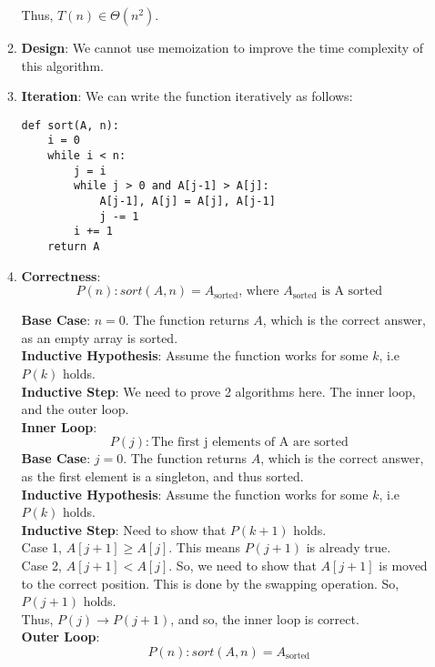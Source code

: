 \documentclass[a4paper]{article}
\begin{document}
\begin{enumerate}
\begin{enumerate}[label=\roman*]
Thus, $T(n) \in \Theta(n^2)$.\\

\item \textbf{Design}: We cannot use memoization to improve the time complexity of this algorithm.

\item \textbf{Iteration}: We can write the function iteratively as follows:

\begin{verbatim}
def sort(A, n):
    i = 0
    while i < n:
        j = i
        while j > 0 and A[j-1] > A[j]:
            A[j-1], A[j] = A[j], A[j-1]
            j -= 1
        i += 1
    return A
\end{verbatim}

\item \textbf{Correctness}:
$$P(n): sort(A, n) = A_{\text{sorted}} \text{, where } A_{\text{sorted}} \text{ is A sorted}$$

\textbf{Base Case}: $n = 0$. The function returns $A$, which is the correct answer, as an empty array is sorted. \\
\textbf{Inductive Hypothesis}: Assume the function works for some $k$, i.e $P(k)$ holds.\\
\textbf{Inductive Step}: We need to prove 2 algorithms here. The inner loop, and the outer loop.\\

\textbf{Inner Loop}:\\
$$P(j): \text{The first j elements of A are sorted}$$
\textbf{Base Case}: $j = 0$. The function returns $A$, which is the correct answer, as the first element is a singleton, and thus sorted. \\
\textbf{Inductive Hypothesis}: Assume the function works for some $k$, i.e $P(k)$ holds.\\
\textbf{Inductive Step}: Need to show that $P(k+1)$ holds.\\

Case 1, $A[j+1] \geq A[j]$. This means $P(j+1)$ is already true.\\

Case 2, $A[j+1] < A[j]$. So, we need to show that $A[j+1]$ is moved to the correct position. This is done by the swapping operation. So, $P(j+1)$ holds.\\

Thus, $P(j) \rightarrow P(j+1)$, and so, the inner loop is correct.\\

\textbf{Outer Loop}:\\
$$P(n): sort(A, n) = A_{\text{sorted}}$$


\end{enumerate}
\end{enumerate}
\end{document}
